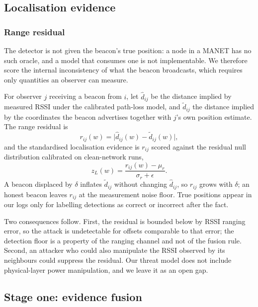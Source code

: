 \documentclass[pdflatex,sn-mathphys-num]{sn-jnl}%
\theoremstyle{thmstyleone}%
\theoremstyle{thmstyletwo}%
\theoremstyle{thmstylethree}%
\begin{document}
\subsection{Localisation evidence}

\subsubsection{Range residual}

The detector is not given the beacon's true position: a node in a MANET has no
such oracle, and a model that consumes one is not implementable. We therefore
score the internal inconsistency of what the beacon broadcasts, which requires
only quantities an observer can measure.

For observer $j$ receiving a beacon from $i$, let $\hat d_{ij}$ be the distance
implied by measured RSSI under the calibrated path-loss model, and
$\tilde d_{ij}$ the distance implied by the coordinates the beacon advertises
together with $j$'s own position estimate. The range residual is
\begin{equation}
\label{eq:resid}
r_{ij}(w) = \bigl| \hat d_{ij}(w) - \tilde d_{ij}(w) \bigr|,
\end{equation}
and the standardised localisation evidence is $r_{ij}$ scored against the
residual null distribution calibrated on clean-network runs,
\begin{equation}
\label{eq:zl}
z_L(w) = \frac{r_{ij}(w) - \mu_r}{\sigma_r + \epsilon}.
\end{equation}
A beacon displaced by $\delta$ inflates $\tilde d_{ij}$ without changing
$\hat d_{ij}$, so $r_{ij}$ grows with $\delta$; an honest beacon leaves $r_{ij}$
at the measurement noise floor. True positions appear in our logs only for
labelling detections as correct or incorrect after the fact.

Two consequences follow. First, the residual is bounded below by RSSI ranging
error, so the attack is undetectable for offsets comparable to that error; the
detection floor is a property of the ranging channel and not of the fusion
rule. Second, an attacker who could also manipulate the RSSI observed by its
neighbours could suppress the residual. Our threat model does not include
physical-layer power manipulation, and we leave it as an open gap.

\subsection{Stage one: evidence fusion}
\end{document}

